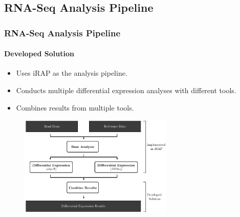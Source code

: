 \documentclass{beamer}
\begin{document}
\subsection{RNA-Seq Analysis Pipeline}
\begin{frame}[allowframebreaks]
  \frametitle{RNA-Seq Analysis Pipeline}
  \framesubtitle{Developed Solution}

\begin{itemize}\small
\item
Uses iRAP as the analysis pipeline.

\item
Conducts multiple differential expression analyses with different tools.

\item
Combines results from multiple tools.
\end{itemize}

\begin{figure}
  \centering
  \includegraphics[width=0.65\textwidth]{tool1}
\end{figure}








\end{frame}
\end{document}
